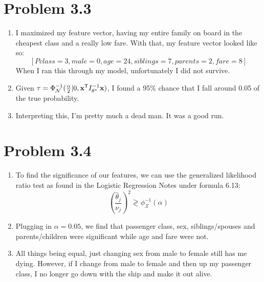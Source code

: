\documentclass{article}
\begin{document}
\section*{Problem 3.3}
\begin{enumerate}[label=(\alph*)]
  \item I maximized my feature vector, having my entire family on board in the cheapest class and a really low fare. With that, my feature vector looked like so: \[[Pclass=3, male=0, age=24, siblings=7, parents=2, fare=8]\] When I ran this through my model, unfortunately I did not survive.
  \item Given $\tau = \Phi^{-1}_{\mathcal{N}}(\frac{\alpha}{2} | 0, \textbf{x}^{\sf{T}}I^{-1}_{\theta^*}\textbf{x})$, I found a 95\% chance that I fall around 0.05 of the true probability. 
  \item Interpreting this, I'm pretty much a dead man. It was a good run.
\end{enumerate}

\section*{Problem 3.4}
\begin{enumerate}[label=(\alph*)]
  \item To find the significance of our features, we can use the generalized likelihood ratio test as found in the Logistic Regression Notes under formula 6.13: \[(\frac{\hat{\theta}_j}{\nu_j})^2 \gtrless \phi^{-1}_{\mathcal{X}}(\alpha) \]
  \item Plugging in $\alpha = 0.05$, we find that passenger class, sex, siblings/spouses and parents/children were significant while age and fare were not.
  \item All things being equal, just changing sex from male to female still has me dying. However, if I change from male to female and then up my passenger class, I no longer go down with the ship and make it out alive.
\end{enumerate}
\end{document}
